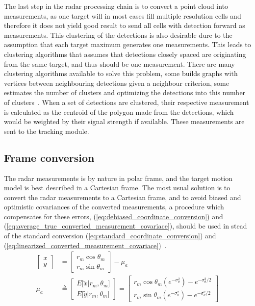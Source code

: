 The last step in the radar processing chain is to convert a point cloud into measurements, as one target will in most cases fill multiple resolution cells and therefore it does not yield good result to send all cells with detection forward as measurements. This clustering of the detections is also desirable dure to the assumption that each target maximum generates one measurements. This leads to clustering algorithms that assumes that detections closely spaced are originating from the same target, and thus should be one measurement. There are many clustering algorithms available to solve this problem, some builds graphs with vertices between neighbouring detections given a neighbour criterion, some estimates the number of clusters and optimizing the detections into this number of clusters~\cite{Mahmuddin2010,Pelleg2000,Brekke2010}. When a set of detections are clustered, their respective measurement is calculated as the centroid of the polygon made from the detections, which would be weighted by their signal strength if available. These measurements are sent to the tracking module.

\subsection{Frame conversion}\label{subsec:frame_conversion}
The radar measurements is by nature in polar frame, and the target motion model is best described in a Cartesian frame. The most usual solution is to convert the radar measurements to a Cartesian frame, and to avoid biased and optimistic covariances of the converted measurements, a procedure which compensates for these errors, (\ref{eq:debiased_coordinate_conversion}) and (\ref{eq:average_true_converted_measurement_covariace}), should be used in stead of the standard conversion (\ref{eq:standard_coordinate_conversion}) and (\ref{eq:linearized_converted_measurement_covariace})~\cite{Bar-Shalom1995}.
\begin{equation}\label{eq:debiased_coordinate_conversion}
\begin{split}
\begin{bmatrix} x \\ y \end{bmatrix} &= \begin{bmatrix} r_m \cos \theta_m \\ r_m \sin \theta_m \end{bmatrix} - \mu_a \\
\mu_a & \triangleq 
\begin{bmatrix}
	E \lbrack \tilde{x}|r_m,\theta_m \rbrack \\ 
	E \lbrack \tilde{y}|r_m,\theta_m \rbrack 
\end{bmatrix} 
= 
\begin{bmatrix}
	r_m \cos \theta_m (e^{-\sigma^2_\theta}) - e^{-\sigma^2_\theta / 2} \\ 
	r_m \sin \theta_m (e^{-\sigma^2_\theta}) - e^{-\sigma^2_\theta / 2}
\end{bmatrix} 
\end{split}
\end{equation}

